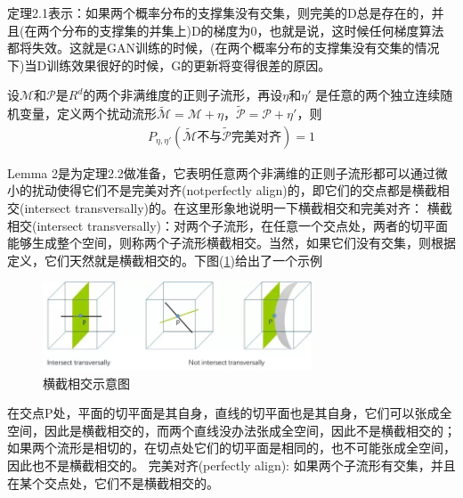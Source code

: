             \par
            定理2.1表示：如果两个概率分布的支撑集没有交集，则完美的D总是存在的，并且(在两个分布的支撑集的并集上)D的梯度为0，也就是说，这时候任何梯度算法都将失效。这就是GAN训练的时候，(在两个概率分布的支撑集没有交集的情况下)当D训练效果很好的时候，G的更新将变得很差的原因。
            \begin{lemma}[Lemma 2]
            设$\mathcal{M}$和$\mathcal{P}$是$R^d$的两个非满维度的正则子流形，再设$\eta$和$\eta'$ 是任意的两个独立连续随机变量，定义两个扰动流形$\tilde{\mathcal{M}} = \mathcal{M} + \eta$，$\tilde{\mathcal{P}}= \mathcal{P} + \eta'$，则
            \begin{align*}
            P_{\eta,\eta'}(\tilde{\mathcal{M}}\text{不与}\tilde{\mathcal{P}}\text{完美对齐}) = 1
            \end{align*}
            \end{lemma}
            \par
            Lemma 2是为定理2.2做准备，它表明任意两个非满维的正则子流形都可以通过微小的扰动使得它们不是完美对齐(notperfectly align)的，即它们的交点都是横截相交(intersect transversally)的。在这里形象地说明一下横截相交和完美对齐：
            横截相交(intersect transversally)：对两个子流形，在任意一个交点处，两者的切平面能够生成整个空间，则称两个子流形横截相交。当然，如果它们没有交集，则根据定义，它们天然就是横截相交的。下图(\ref{fig:横截相交示意图})给出了一个示例
                \begin{figure}[H]
                \centering
                \includegraphics[width=8cm]{images/Cross_intersecting.jpg}
                \caption{横截相交示意图}
                \label{fig:横截相交示意图}
                \end{figure}
            在交点P处，平面的切平面是其自身，直线的切平面也是其自身，它们可以张成全空间，因此是横截相交的，而两个直线没办法张成全空间，因此不是横截相交的；如果两个流形是相切的，在切点处它们的切平面是相同的，也不可能张成全空间，因此也不是横截相交的。
            完美对齐(perfectly align): 如果两个子流形有交集，并且在某个交点处，它们不是横截相交的。
            \par
